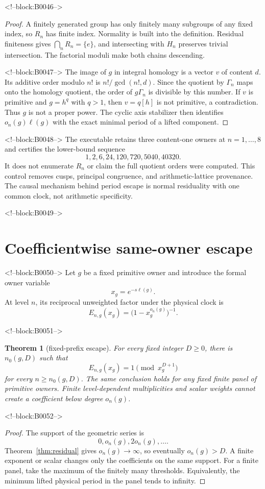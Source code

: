 \documentclass[11pt]{article}
\newtheorem{theorem}{Theorem}[section]
\theoremstyle{definition}
\theoremstyle{remark}
\begin{document}
<!--block:B0046-->
\begin{proof}
A finitely generated group has only finitely many subgroups of any fixed index, so $R_n$ has finite index. Normality is built into the definition. Residual finiteness gives $\bigcap_nR_n=\{e\}$, and intersecting with $H_n$ preserves trivial intersection. The factorial moduli make both chains descending.

<!--block:B0047-->
The image of $g$ in integral homology is a vector $v$ of content $d$. Its additive order modulo $n!$ is $n!/\gcd(n!,d)$. Since the quotient by $\Gamma_n$ maps onto the homology quotient, the order of $g\Gamma_n$ is divisible by this number. If $v$ is primitive and $g=h^q$ with $q>1$, then $v=q[h]$ is not primitive, a contradiction. Thus $g$ is not a proper power. The cyclic axis stabilizer then identifies $o_n(g)\ell(g)$ with the exact minimal period of a lifted component.
\end{proof}

<!--block:B0048-->
The executable retains three content-one owners at $n=1,\ldots,8$ and certifies the lower-bound sequence
\[
1,2,6,24,120,720,5040,40320.
\]
It does not enumerate $R_n$ or claim the full quotient orders were computed. This control removes cusps, principal congruence, and arithmetic-lattice provenance. The causal mechanism behind period escape is normal residuality with one common clock, not arithmetic specificity.

<!--block:B0049-->
\section{Coefficientwise same-owner escape}

<!--block:B0050-->
Let $g$ be a fixed primitive owner and introduce the formal owner variable
\[
x_g=e^{-s\ell(g)}.
\]
At level $n$, its reciprocal unweighted factor under the physical clock is
\[
E_{n,g}(x_g)=\bigl(1-x_g^{o_n(g)}\bigr)^{-1}.
\]

<!--block:B0051-->
\begin{theorem}[fixed-prefix escape]\label{thm:prefix}
For every fixed integer $D\geq0$, there is $n_0(g,D)$ such that
\[
E_{n,g}(x_g)=1\pmod{x_g^{D+1}}
\]
for every $n\geq n_0(g,D)$. The same conclusion holds for any fixed finite panel of primitive owners. Finite level-dependent multiplicities and scalar weights cannot create a coefficient below degree $o_n(g)$.
\end{theorem}

<!--block:B0052-->
\begin{proof}
The support of the geometric series is
\[
0,o_n(g),2o_n(g),\ldots.
\]
Theorem~\ref{thm:residual} gives $o_n(g)\to\infty$, so eventually $o_n(g)>D$. A finite exponent or scalar changes only the coefficients on the same support. For a finite panel, take the maximum of the finitely many thresholds. Equivalently, the minimum lifted physical period in the panel tends to infinity.
\end{proof}
\end{document}
